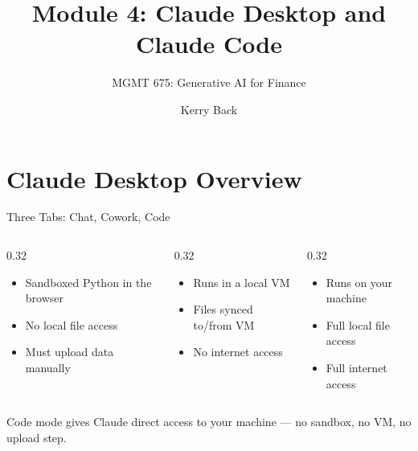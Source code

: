 \documentclass[aspectratio=169]{beamer}
\subtitle{MGMT 675: Generative AI for Finance}
\title{Module 4: Claude Desktop and Claude Code}
\author{Kerry Back}
\date{}
\begin{document}
\maketitle

\section{Claude Desktop Overview}

\begin{frame}{Three Tabs: Chat, Cowork, Code}
\begin{columns}[T]
\begin{column}{0.32\textwidth}
\begin{shadedbox}[title=\textbf{Chat (Analysis)}]
\begin{itemize}\footnotesize
  \item Sandboxed Python in the browser
  \item No local file access
  \item Must upload data manually
\end{itemize}
\end{shadedbox}
\end{column}
\begin{column}{0.32\textwidth}
\begin{shadedbox}[title=\textbf{Cowork}]
\begin{itemize}\footnotesize
  \item Runs in a local VM
  \item Files synced to/from VM
  \item \alert{No internet access}
\end{itemize}
\end{shadedbox}
\end{column}
\begin{column}{0.32\textwidth}
\begin{shadedbox}[title=\textbf{Code}]
\begin{itemize}\footnotesize
  \item Runs on \alert{your machine}
  \item Full local file access
  \item Full internet access
\end{itemize}
\end{shadedbox}
\end{column}
\end{columns}
\vspace{0.3cm}
\begin{center}
\alert{Code mode} gives Claude direct access to your machine --- no sandbox, no VM, no upload step.
\end{center}
\end{frame}
\end{document}
